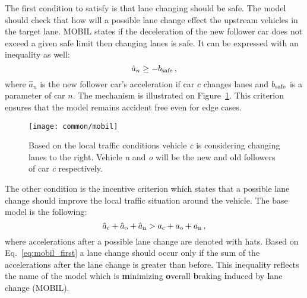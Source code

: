 		The first condition to satisfy is that lane changing should be safe. The model should check that how will a possible lane change effect the upstream vehicles in the target lane. MOBIL \cite{arne2} states if the deceleration of the new follower car does not exceed a given safe limit then changing lanes is safe. It can be expressed with an inequality as well:
		\begin{equation}
			\hat{a}_{n}\geq -b_{\rm safe}\,,
		\end{equation}
		where $\hat{a}_{n}$ is the new follower car's acceleration if car $c$ changes lanes and $b_{\rm safe}$ is a parameter of car $n$. The mechanism is illustrated on Figure~\ref{fig:mobil}. This criterion ensures that the model remains accident free even for edge cases.
			\begin{figure}
				\centering
				\texttt{[image: common/mobil]}
				\caption{Based on the local traffic conditions vehicle \textit{c} is considering changing lanes to the right. Vehicle \textit{n} and \textit{o} will be the new and old followers of car \textit{c} respectively.}
				\label{fig:mobil}
			\end{figure}

			The other condition is the incentive criterion which states that a possible lane change should improve the local traffic situation around the vehicle. The base model is the following:
			\begin{equation}
				\hat{a}_{\rm c} + \hat{a}_{\rm o} + \hat{a}_{\rm n} > a_{\rm c} + a_{\rm o} + a_{\rm n}\,,
				\label{eq:mobil_first}
			\end{equation}
			where accelerations after a possible lane change are denoted with hats.
			Based on Eq.~\eqref{eq:mobil_first} a lane change should occur only if the sum of the accelerations after the lane change is greater than before. This inequality reflects the name of the model which is \textbf{m}inimizing \textbf{o}verall \textbf{b}raking \textbf{i}nduced by \textbf{l}ane change (MOBIL).

